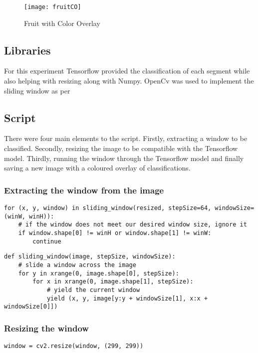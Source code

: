 \begin{figure}
    \texttt{[image: fruitCO]}
    \caption{Fruit with Color Overlay}
    \label{fig:fruitOverlay}
\end{figure}

\subsection*{Libraries}
For this experiment Tensorflow provided the classification of each segment while
also helping with resizing along with Numpy. OpenCv was used to implement the
sliding window as per \textcite{slidingWindowTut}

\subsection*{Script}
There were four main elements to the script. Firstly, extracting a window to be
classified. Secondly, resizing the image to be compatible with the Tensorflow
model. Thirdly, running the window through the Tensorflow model and finally
saving a new image with a coloured overlay of classifications.

\subsubsection*{Extracting the window from the image}
\begin{lstlisting}
for (x, y, window) in sliding_window(resized, stepSize=64, windowSize=(winW, winH)):
	# if the window does not meet our desired window size, ignore it
	if window.shape[0] != winH or window.shape[1] != winW:
		continue
\end{lstlisting}


\begin{lstlisting}
def sliding_window(image, stepSize, windowSize):
	# slide a window across the image
	for y in xrange(0, image.shape[0], stepSize):
		for x in xrange(0, image.shape[1], stepSize):
			# yield the current window
			yield (x, y, image[y:y + windowSize[1], x:x + windowSize[0]])
\end{lstlisting}

\subsubsection*{Resizing the window}
\begin{lstlisting}
window = cv2.resize(window, (299, 299))
\end{lstlisting}

